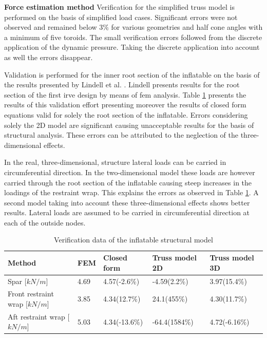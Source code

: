 \textbf{Force estimation method}
Verification for the simplified truss model is performed on the basis of simplified load cases. Significant errors were not observed and remained below 3\% for various geometries and half cone angles with a minimum of five toroids. The small verification errors followed from the discrete application of the dynamic pressure. Taking the discrete application into account as well the errors disappear.

Validation is performed for the inner root section of the inflatable on the basis of the results presented by Lindell et al. \cite{Lindell2006}. Lindell presents results for the root section of the first \gls{irve} design by means of \gls{fem} analysis. Table \ref{tab:struc_val} presents the results of this validation effort presenting moreover the results of closed form equations valid for solely the root section of the inflatable. Errors considering solely the 2D model are significant causing unacceptable results for the basis of structural analysis. These errors can be attributed to the neglection of the three-dimensional effects. 

In the real, three-dimensional, structure lateral loads can be carried in circumferential direction. In the two-dimensional model these loads are however carried through the root section of the inflatable causing steep increases in the loadings of the restraint wrap. This explains the errors as observed in Table \ref{tab:struc_val}. A second model taking into account these three-dimensional effects shows better results. Lateral loads are assumed to be carried in circumferential direction at each of the outside nodes. 

\begin{table}[h]
\centering
\caption{Verification data of the inflatable structural model}
\label{tab:struc_val} 
\begin{tabular}{|l|l|l|l|l|} \hline
Method                            & FEM \cite{Lindell2006} & Closed form \cite{Lindell2006} & Truss model 2D & Truss model 3D \\ \hline \hline
Spar [$kN/m$]                 & 4.69                     & 4.57(-2.6\%)                     & -4.59(2.2\%)   & 3.97(15.4\%)   \\ \hline
Front restraint wrap [$kN/m$] & 3.85                     & 4.34(12.7\%)                     & 24.1(455\%)    & 4.30(11.7\%)   \\ \hline
Aft restraint wrap [$kN/m$]   & 5.03                     & 4.34(-13.6\%)                    & -64.4(1584\%)  & 4.72(-6.16\%) \\ \hline
\end{tabular}
\end{table}

